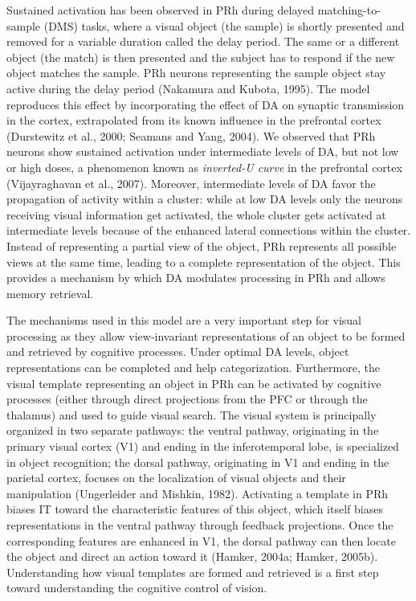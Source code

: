 \documentclass[
  11pt,
  a4paper,
]{scrbook}
\begin{document}
Sustained activation has been observed in PRh during delayed
matching-to-sample (DMS) tasks, where a visual object (the sample) is
shortly presented and removed for a variable duration called the delay
period. The same or a different object (the match) is then presented and
the subject has to respond if the new object matches the sample. PRh
neurons representing the sample object stay active during the delay
period (Nakamura and Kubota, 1995). The model reproduces this effect by
incorporating the effect of DA on synaptic transmission in the cortex,
extrapolated from its known influence in the prefrontal cortex
(Durstewitz et al., 2000; Seamans and Yang, 2004). We observed that PRh
neurons show sustained activation under intermediate levels of DA, but
not low or high doses, a phenomenon known as \emph{inverted-U curve} in
the prefrontal cortex (Vijayraghavan et al., 2007). Moreover,
intermediate levels of DA favor the propagation of activity within a
cluster: while at low DA levels only the neurons receiving visual
information get activated, the whole cluster gets activated at
intermediate levels because of the enhanced lateral connections within
the cluster. Instead of representing a partial view of the object, PRh
represents all possible views at the same time, leading to a complete
representation of the object. This provides a mechanism by which DA
modulates processing in PRh and allows memory retrieval.

The mechanisms used in this model are a very important step for visual
processing as they allow view-invariant representations of an object to
be formed and retrieved by cognitive processes. Under optimal DA levels,
object representations can be completed and help categorization.
Furthermore, the visual template representing an object in PRh can be
activated by cognitive processes (either through direct projections from
the PFC or through the thalamus) and used to guide visual search. The
visual system is principally organized in two separate pathways: the
ventral pathway, originating in the primary visual cortex (V1) and
ending in the inferotemporal lobe, is specialized in object recognition;
the dorsal pathway, originating in V1 and ending in the parietal cortex,
focuses on the localization of visual objects and their manipulation
(Ungerleider and Mishkin, 1982). Activating a template in PRh biases IT
toward the characteristic features of this object, which itself biases
representations in the ventral pathway through feedback projections.
Once the corresponding features are enhanced in V1, the dorsal pathway
can then locate the object and direct an action toward it (Hamker,
2004a; Hamker, 2005b). Understanding how visual templates are formed and
retrieved is a first step toward understanding the cognitive control of
vision.
\end{document}
